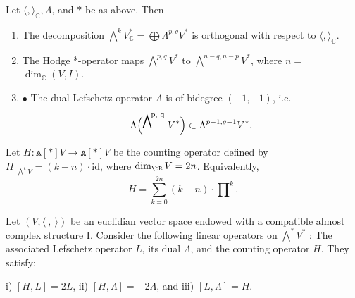 \begin{lemma}
  Let $\langle,\rangle_{\mathbb{C}}, \Lambda$, and $*$ be as above. Then
  \begin{enumerate}[label=\roman*),font=\upshape]
    \item The decomposition $\bigwedge^k V_{\mathbb{C}}^*=\bigoplus \Lambda^{p, q} V^*$ is orthogonal with respect to $\langle,\rangle_{\mathbb{C}}$.
    \item The Hodge *-operator maps $\bigwedge^{p, q} V^*$ to $\bigwedge^{n-q, n-p} V^*$, where $n=$ $\operatorname{dim}_{\mathbb{C}}(V, I)$.
    \item $\bullet$ The dual Lefschetz operator $\Lambda$ is of bidegree $(-1,-1)$, i.e. 
    $$\Lambda\Bigl(\Wedge[p, q] V^*\Bigr) \subset\Lambda^{p-1, q-1} V^*.$$
  \end{enumerate}
\end{lemma}
\begin{definition}
  Let $H\colon \Wedge[*]V\to\Wedge[*]V$ be the \textsf{counting operator} defined by $H|_{\bigwedge^k V}=(k-n)\cdot \mathrm{id}$, where $\dim_{\bR}V=2n$. Equivalently, 
  \[
    H=\sum_{k=0}^{2n}(k-n)\cdot \prod\nolimits^k.
  \]
\end{definition}
\begin{proposition}
  Let $(V,\langle~,~\rangle)$ be an euclidian vector space endowed with a compatible almost complex structure I. Consider the following linear operators on $\bigwedge^* V^*$ : The associated Lefschetz operator $L$, its dual $\Lambda$, and the counting operator $H$. They satisfy:
  \begin{center}
    i) $[H, L]=2 L$, \quad ii) $[H, \Lambda]=-2 \Lambda$, \quad and \; iii) $[L, \Lambda]=H$.
  \end{center}
\end{proposition}

